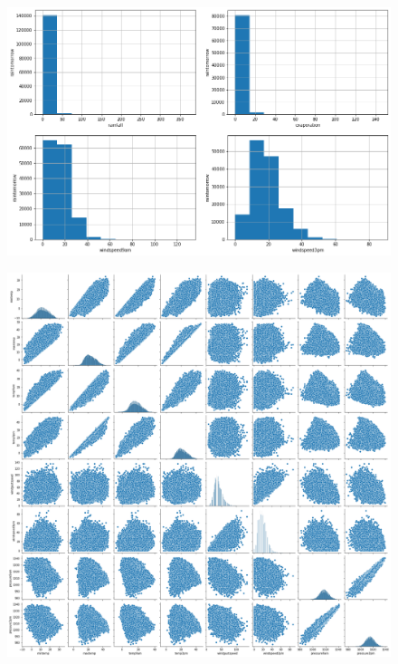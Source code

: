 \documentclass{beamer}
\begin{document}
\begin{frame}[plain]
    \begin{figure}
        \includegraphics[width=\textwidth]{images/distribution.png}
    \end{figure}
\end{frame}

\begin{frame}[plain]
    \begin{figure}
        \includegraphics[width=.8\textwidth]{images/corr.png}
    \end{figure}
\end{frame}
\end{document}
